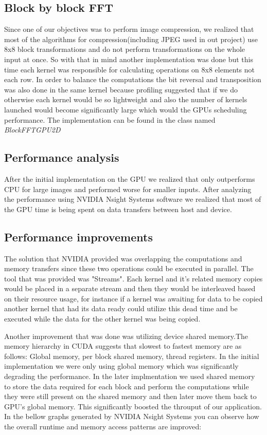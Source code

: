 \subsection{Block by block FFT}
Since one of our objectives was to perform image compression, we realized that most of the algorithms for compression(including JPEG used in out project) use 8x8 block transformations and do not perform transformations on the whole input at once. So with that in mind another implementation was done but this time each kernel was responsible for calculating operations on 8x8 elements not each row. In order to balance the computations the bit reversal and transposition was also done in the same kernel because profiling suggested that if we do otherwise each kernel would be so lightweight and also the number of kernels launched would become significantly large which would the GPUs scheduling performance. The implementation can be found in the class named \textit{BlockFFTGPU2D}

\subsection{Performance analysis}
After the initial implementation on the GPU we realized that only outperforms CPU for large images and performed worse for smaller inputs. After analyzing the performance using NVIDIA Nsight Systems software we realized that most of the GPU time is being spent on data transfers between host and device. 

\subsection{Performance improvements}
The solution that NVIDIA provided was overlapping the computations and memory transfers since these two operations could be executed in parallel. The tool that was provided was "Streams". Each kernel and it's related memory copies would be placed in a separate stream and then they would be interleaved based on their resource usage, for instance if a kernel was awaiting for data to be copied another kernel that had its data ready could utilize this dead time and be executed while the data for the other kernel was being copied.
\\
\par Another improvement that was done was utilizing device shared memory.The memory hierarchy in CUDA suggests that slowest to fastest memory are as follows: Global memory, per block shared memory, thread registers. In the initial implementation we were only using global memory which was significantly degrading the performance. In the later implmentation we used shared memory to store the data required for each block and perform the computations while they were still present on the shared memory and then later move them back to GPU's global memory. This significantly boosted the throuput of our application. In the bellow graphs generated by NVIDIA Nsight Systems you can observe how the overall runtime and memory access patterns are improved:

